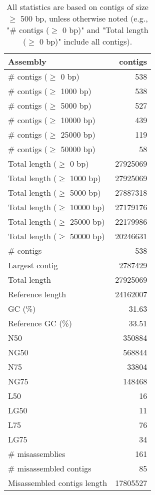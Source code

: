 \documentclass[12pt,a4paper]{article}
\begin{document}
\begin{table}[ht]
\begin{center}
\caption{All statistics are based on contigs of size $\geq$ 500 bp, unless otherwise noted (e.g., "\# contigs ($\geq$ 0 bp)" and "Total length ($\geq$ 0 bp)" include all contigs).}
\begin{tabular}{|l*{1}{|r}|}
\hline
Assembly & contigs \\ \hline
\# contigs ($\geq$ 0 bp) & 538 \\ \hline
\# contigs ($\geq$ 1000 bp) & 538 \\ \hline
\# contigs ($\geq$ 5000 bp) & 527 \\ \hline
\# contigs ($\geq$ 10000 bp) & 439 \\ \hline
\# contigs ($\geq$ 25000 bp) & 119 \\ \hline
\# contigs ($\geq$ 50000 bp) & 58 \\ \hline
Total length ($\geq$ 0 bp) & 27925069 \\ \hline
Total length ($\geq$ 1000 bp) & 27925069 \\ \hline
Total length ($\geq$ 5000 bp) & 27887318 \\ \hline
Total length ($\geq$ 10000 bp) & 27179176 \\ \hline
Total length ($\geq$ 25000 bp) & 22179986 \\ \hline
Total length ($\geq$ 50000 bp) & 20246631 \\ \hline
\# contigs & 538 \\ \hline
Largest contig & 2787429 \\ \hline
Total length & 27925069 \\ \hline
Reference length & 24162007 \\ \hline
GC (\%) & 31.63 \\ \hline
Reference GC (\%) & 33.51 \\ \hline
N50 & 350884 \\ \hline
NG50 & 568844 \\ \hline
N75 & 33804 \\ \hline
NG75 & 148468 \\ \hline
L50 & 16 \\ \hline
LG50 & 11 \\ \hline
L75 & 76 \\ \hline
LG75 & 34 \\ \hline
\# misassemblies & 161 \\ \hline
\# misassembled contigs & 85 \\ \hline
Misassembled contigs length & 17805527 \\ \hline

\end{tabular}
\end{center}
\end{table}
\end{document}
